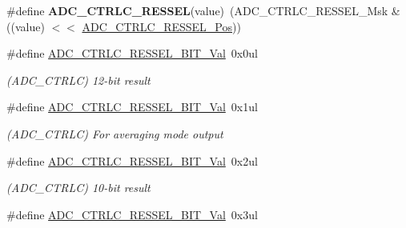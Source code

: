 \begin{DoxyCompactItemize}
\item 
\hypertarget{group___s_a_m_l21___a_d_c_gad64caf24c79e7b9f1b60b5e6b65389e5}{}\#define {\bfseries A\+D\+C\+\_\+\+C\+T\+R\+L\+C\+\_\+\+R\+E\+S\+S\+E\+L}(value)~(A\+D\+C\+\_\+\+C\+T\+R\+L\+C\+\_\+\+R\+E\+S\+S\+E\+L\+\_\+\+Msk \& ((value) $<$$<$ \hyperlink{group___s_a_m_l21___a_d_c_ga8e61247becfe523ab5564856a3896df0}{A\+D\+C\+\_\+\+C\+T\+R\+L\+C\+\_\+\+R\+E\+S\+S\+E\+L\+\_\+\+Pos}))\label{group___s_a_m_l21___a_d_c_gad64caf24c79e7b9f1b60b5e6b65389e5}

\item 
\hypertarget{group___s_a_m_l21___a_d_c_gafa811f4a3d6fecef363d471891e2867f}{}\#define \hyperlink{group___s_a_m_l21___a_d_c_gafa811f4a3d6fecef363d471891e2867f}{A\+D\+C\+\_\+\+C\+T\+R\+L\+C\+\_\+\+R\+E\+S\+S\+E\+L\+\_\+B\+I\+T\+\_\+\+Val}~0x0ul\label{group___s_a_m_l21___a_d_c_gafa811f4a3d6fecef363d471891e2867f}

\begin{DoxyCompactList}\small\item\em (A\+D\+C\+\_\+\+C\+T\+R\+L\+C) 12-\/bit result \end{DoxyCompactList}\item 
\hypertarget{group___s_a_m_l21___a_d_c_gab6dc26c78973c7178ab7894f3fe69ff8}{}\#define \hyperlink{group___s_a_m_l21___a_d_c_gab6dc26c78973c7178ab7894f3fe69ff8}{A\+D\+C\+\_\+\+C\+T\+R\+L\+C\+\_\+\+R\+E\+S\+S\+E\+L\+\_\+B\+I\+T\+\_\+\+Val}~0x1ul\label{group___s_a_m_l21___a_d_c_gab6dc26c78973c7178ab7894f3fe69ff8}

\begin{DoxyCompactList}\small\item\em (A\+D\+C\+\_\+\+C\+T\+R\+L\+C) For averaging mode output \end{DoxyCompactList}\item 
\hypertarget{group___s_a_m_l21___a_d_c_gac9552e22763d3922fa97b53d3f79a69a}{}\#define \hyperlink{group___s_a_m_l21___a_d_c_gac9552e22763d3922fa97b53d3f79a69a}{A\+D\+C\+\_\+\+C\+T\+R\+L\+C\+\_\+\+R\+E\+S\+S\+E\+L\+\_\+B\+I\+T\+\_\+\+Val}~0x2ul\label{group___s_a_m_l21___a_d_c_gac9552e22763d3922fa97b53d3f79a69a}

\begin{DoxyCompactList}\small\item\em (A\+D\+C\+\_\+\+C\+T\+R\+L\+C) 10-\/bit result \end{DoxyCompactList}\item 
\hypertarget{group___s_a_m_l21___a_d_c_gab3c8528153efdad64697e48470c3aa10}{}\#define \hyperlink{group___s_a_m_l21___a_d_c_gab3c8528153efdad64697e48470c3aa10}{A\+D\+C\+\_\+\+C\+T\+R\+L\+C\+\_\+\+R\+E\+S\+S\+E\+L\+\_\+B\+I\+T\+\_\+\+Val}~0x3ul\label{group___s_a_m_l21___a_d_c_gab3c8528153efdad64697e48470c3aa10}


\end{DoxyCompactItemize}
